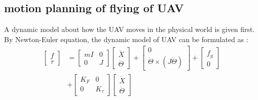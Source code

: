\documentclass{ieeeaccess}
\begin{document}
\subsection{motion planning of flying of UAV}
A dynamic model about how the UAV moves in the physical world is given first. By Newton-Euler equation, the dynamic model of UAV can be formulated as \cite{sabatino2015quadrotor}:
\begin{equation} \label{eq:uav} 
    \begin{split}
        \begin{bmatrix}
            f \\ \tau
        \end{bmatrix}&=\begin{bmatrix}
            mI & 0 \\ 0 & J
        \end{bmatrix}\begin{bmatrix}
            \ddot{X} \\ \ddot{\Theta}
        \end{bmatrix}+\begin{bmatrix}
            0 \\ \dot{\Theta}\times(J\dot{\Theta})
        \end{bmatrix}+\begin{bmatrix}
            f_g \\ 0
        \end{bmatrix}
        \\
        &+\begin{bmatrix}
            K_F & 0 \\
            0 & K_\tau
        \end{bmatrix}\begin{bmatrix}
            \dot{X} \\ \dot{\Theta}
        \end{bmatrix}
    \end{split}
\end{equation}
\end{document}
